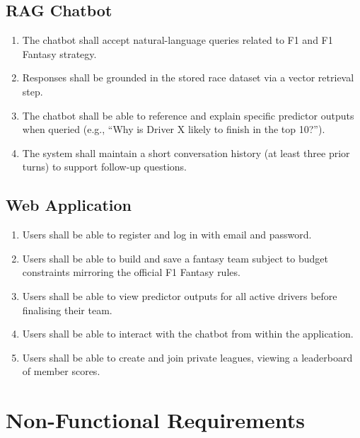\documentclass[12pt, a4paper, oneside]{report}
\begin{document}
\subsection{RAG Chatbot}

\begin{enumerate}[leftmargin=*,label=FR-CB\arabic*.]
  \item The chatbot shall accept natural-language queries related to F1 and
        F1 Fantasy strategy.
  \item Responses shall be grounded in the stored race dataset via a vector
        retrieval step.
  \item The chatbot shall be able to reference and explain specific predictor
        outputs when queried (e.g., ``Why is Driver X likely to finish in the
        top 10?'').
  \item The system shall maintain a short conversation history (at least three
        prior turns) to support follow-up questions.
\end{enumerate}

\subsection{Web Application}

\begin{enumerate}[leftmargin=*,label=FR-WA\arabic*.]
  \item Users shall be able to register and log in with email and password.
  \item Users shall be able to build and save a fantasy team subject to
        budget constraints mirroring the official F1 Fantasy rules.
  \item Users shall be able to view predictor outputs for all active drivers
        before finalising their team.
  \item Users shall be able to interact with the chatbot from within the
        application.
  \item Users shall be able to create and join private leagues, viewing a
        leaderboard of member scores.
\end{enumerate}

\section{Non-Functional Requirements}
\end{document}
